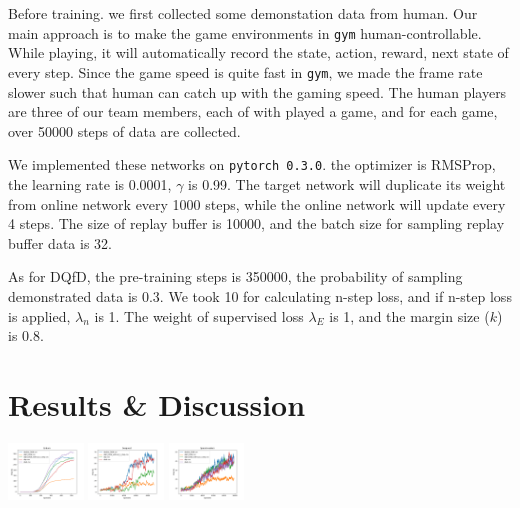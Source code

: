 \documentclass[a0,portrait]{a0poster}
\begin{document}
\begin{multicols}{2}
Before training. we first collected some demonstation data from human. Our main approach is to make the game environments in \texttt{gym} human-controllable. While playing, it will automatically record the state, action, reward, next state of every step. Since the game speed is quite fast in \texttt{gym}, we made the frame rate slower such that human can catch up with the gaming speed. The human players are three of our team members, each of with played a game, and for each game, over 50000 steps of data are collected.


We implemented these networks on \texttt{pytorch 0.3.0}. the optimizer is RMSProp, the learning rate is 0.0001, $\gamma$ is 0.99. The target network will duplicate its weight from online network every 1000 steps, while the online network will update every 4 steps. The size of replay buffer is 10000, and the batch size for sampling replay buffer data is 32.\par

As for DQfD, the pre-training steps is 350000, the probability of sampling demonstrated data is 0.3. We took 10 for calculating n-step loss, and if n-step loss is applied, $\lambda_n$ is 1. The weight of supervised loss $\lambda_E$ is 1, and the margin size ($k$) is 0.8.



\section*{Results \& Discussion}

\includegraphics[width=0.15\textwidth]{Enduro}
\includegraphics[width=0.15\textwidth]{Seaquest}
\includegraphics[width=0.15\textwidth]{SpaceInvaders}


\end{multicols}
\end{document}
